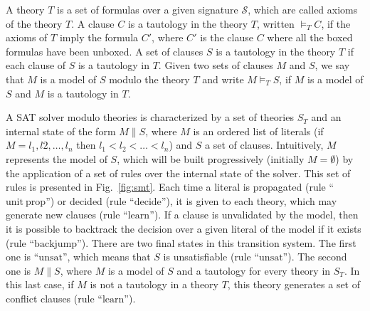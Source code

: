 A theory $T$ is a set of formulas over a given signature $\mathcal{S}$, which
are called axioms of the theory $T$. A clause $C$ is a tautology in the theory
$T$, written $\models_TC$, if the axioms of $T$ imply the formula $C'$, where
$C'$ is the clause $C$ where all the boxed formulas have been unboxed. A set of
clauses $S$ is a tautology in the theory $T$ if each clause of $S$ is a
tautology in $T$. Given two sets of clauses $M$ and $S$, we say that $M$ is a
model of $S$ modulo the theory $T$ and write $M\models_TS$, if $M$ is a model of
$S$ and $M$ is a tautology in $T$.

A SAT solver modulo theories is characterized by a set of theories $S_T$ and an
internal state of the form $M\parallel{}S$, where $M$ is an ordered list of
literals (if $M=l_1,l2,\ldots,l_n$ then $l_1<l_2<\ldots<l_n$) and $S$ a set of
clauses. Intuitively, $M$ represents the model of $S$, which will be built
progressively (initially $M=\emptyset$) by the application of a set of rules
over the internal state of the solver. This set of rules is presented in
Fig.~\ref{fig:smt}. Each time a literal is propagated (rule
``$\mathrm{unit~prop}$'') or decided (rule ``$\mathrm{decide}$''), it is given
to each theory, which may generate new clauses (rule ``$\mathrm{learn}$''). If a
clause is unvalidated by the model, then it is possible to backtrack the
decision over a given literal of the model if it exists (rule
``$\mathrm{backjump}$'').  There are two final states in this transition
system. The first one is ``$\mathrm{unsat}$'', which means that $S$ is
unsatisfiable (rule ``$\mathrm{unsat}$''). The second one is $M\parallel{}S$,
where $M$ is a model of $S$ and a tautology for every theory in $S_T$. In this
last case, if $M$ is not a tautology in a theory $T$, this theory generates a
set of conflict clauses (rule ``$\mathrm{learn}$'').

